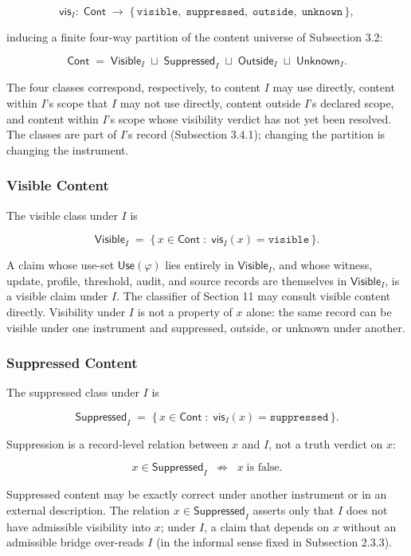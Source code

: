 \documentclass[11pt]{article}
\theoremstyle{definition}
\begin{document}
\[
\mathsf{vis}_I:\;\mathsf{Cont}\;\to\;\{\,\texttt{visible},\;\texttt{suppressed},\;\texttt{outside},\;\texttt{unknown}\,\},
\]

inducing a finite four-way partition of the content universe of Subsection 3.2:

\[
\mathsf{Cont}\;=\;\mathsf{Visible}_I\;\sqcup\;\mathsf{Suppressed}_I\;\sqcup\;\mathsf{Outside}_I\;\sqcup\;\mathsf{Unknown}_I.
\]

The four classes correspond, respectively, to content \(I\) may use directly, content within \(I\)'s scope that \(I\) may not use directly, content outside \(I\)'s declared scope, and content within \(I\)'s scope whose visibility verdict has not yet been resolved. The classes are part of \(I\)'s record (Subsection 3.4.1); changing the partition is changing the instrument.

\subsubsection{Visible Content}

The visible class under \(I\) is

\[
\mathsf{Visible}_I\;=\;\{\,x\in\mathsf{Cont}\;:\;\mathsf{vis}_I(x)=\texttt{visible}\,\}.
\]

A claim whose use-set \(\mathsf{Use}(\varphi)\) lies entirely in \(\mathsf{Visible}_I\), and whose witness, update, profile, threshold, audit, and source records are themselves in \(\mathsf{Visible}_I\), is a visible claim under \(I\). The classifier of Section 11 may consult visible content directly. Visibility under \(I\) is not a property of \(x\) alone: the same record can be visible under one instrument and suppressed, outside, or unknown under another.

\subsubsection{Suppressed Content}

The suppressed class under \(I\) is

\[
\mathsf{Suppressed}_I\;=\;\{\,x\in\mathsf{Cont}\;:\;\mathsf{vis}_I(x)=\texttt{suppressed}\,\}.
\]

Suppression is a record-level relation between \(x\) and \(I\), not a truth verdict on \(x\):

\[
x\in\mathsf{Suppressed}_I\;\;\not\Rightarrow\;\;x\;\text{is false}.
\]

Suppressed content may be exactly correct under another instrument or in an external description. The relation \(x\in\mathsf{Suppressed}_I\) asserts only that \(I\) does not have admissible visibility into \(x\); under \(I\), a claim that depends on \(x\) without an admissible bridge over-reads \(I\) (in the informal sense fixed in Subsection 2.3.3).
\end{document}
